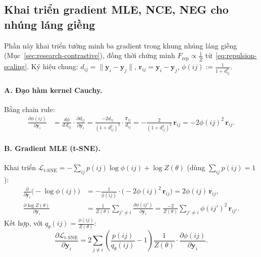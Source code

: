 \subsection{Khai triển gradient MLE, NCE, NEG cho nhúng láng giềng}
\label{app:nce-gradient}

Phần này khai triển tường minh ba gradient trong khung nhúng láng giềng (Mục~\ref{sec:research-contrastive}), đồng thời chứng minh $F_{\text{rep}} \propto \frac{1}{\overline{Z}}$ từ~\eqref{eq:repulsion-scaling}. Ký hiệu chung: $d_{ij} = \|\mathbf{y}_i - \mathbf{y}_j\|$, $\mathbf{r}_{ij} = \mathbf{y}_i - \mathbf{y}_j$, $\phi(ij) := \frac{1}{1+d_{ij}^2}$.

\paragraph{A. Đạo hàm kernel Cauchy.}
Bằng chain rule:
\begin{align*}
  \frac{\partial \phi(ij)}{\partial \mathbf{y}_i}
  &= \frac{d\phi}{d\,d_{ij}}\cdot\frac{\partial d_{ij}}{\partial \mathbf{y}_i}
  = \frac{-2d_{ij}}{(1+d_{ij}^2)^2}\cdot\frac{\mathbf{r}_{ij}}{d_{ij}}
  = -\frac{2}{(1+d_{ij}^2)^2}\,\mathbf{r}_{ij}
  = -2\phi(ij)^2\,\mathbf{r}_{ij}.
\end{align*}

\paragraph{B. Gradient MLE (t-SNE).}
Khai triển $\mathcal{L}_{\text{t-SNE}} = -\sum_{ij}p(ij)\log\phi(ij) + \log Z(\theta)$ (dùng $\sum_{ij}p(ij)=1$):
\begin{align*}
  \frac{\partial}{\partial\mathbf{y}_i}\bigl(-\log\phi(ij)\bigr)
  &= -\frac{1}{\phi(ij)}\cdot\bigl(-2\phi(ij)^2\,\mathbf{r}_{ij}\bigr) = 2\phi(ij)\,\mathbf{r}_{ij},\\[4pt]
  \frac{\partial \log Z(\theta)}{\partial \mathbf{y}_i}
  &= \frac{1}{Z(\theta)}\sum_{j'\neq i}\frac{\partial\phi(ij')}{\partial\mathbf{y}_i}
  = \frac{-2}{Z(\theta)}\sum_{j'\neq i}\phi(ij')^2\,\mathbf{r}_{ij'}.
\end{align*}
Kết hợp, với $q_\theta(ij) = \frac{\phi(ij)}{Z(\theta)}$:
\begin{equation}
  \frac{\partial\mathcal{L}_{\text{t-SNE}}}{\partial\mathbf{y}_i}
  = 2\sum_{j\neq i}\!\left(\frac{p(ij)}{q_\theta(ij)}-1\right)\frac{1}{Z(\theta)}
    \cdot\frac{\partial\phi(ij)}{\partial\mathbf{y}_i}.
  \label{eq:grad-tsne-app}
\end{equation}

